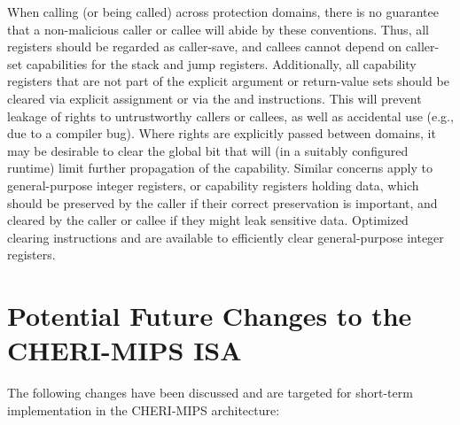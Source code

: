 When calling (or being called) across protection domains, there is no
guarantee that a non-malicious caller or callee will abide by these
conventions.
Thus, all registers should be regarded as caller-save, and callees cannot
depend on caller-set capabilities for the stack and jump registers.
Additionally, all capability registers that are not part of the explicit
argument or return-value sets should be cleared via explicit assignment or
via the  and  instructions.
This will prevent leakage of rights to untrustworthy callers or callees, as
well as accidental use (e.g., due to a compiler bug).
Where rights are explicitly passed between domains, it may be desirable to
clear the global bit that will (in a suitably configured runtime) limit
further propagation of the capability.
Similar concerns apply to general-purpose integer registers, or capability registers
holding data, which should be preserved by the caller if their correct
preservation is important, and cleared by the caller or callee if they might
leak sensitive data.
Optimized clearing instructions  and  are
available to efficiently clear general-purpose integer registers.


\section{Potential Future Changes to the CHERI-MIPS ISA}

The following changes have been discussed and are targeted for short-term
implementation in the CHERI-MIPS architecture:

